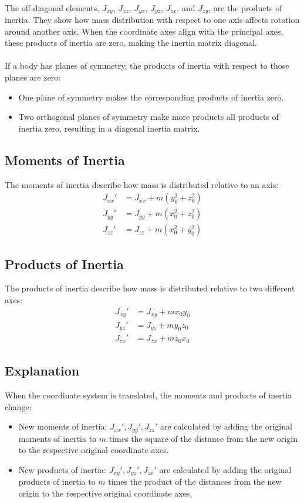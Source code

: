 \\
The off-diagonal elements, \( J_{xy} \), \( J_{xz} \), \( J_{yx} \), \( J_{yz} \), \( J_{zx} \), and \( J_{zy} \), are the products of inertia. They show how mass distribution with respect to one axis affects rotation around another axis. When the coordinate axes align with the principal axes, these products of inertia are zero, making the inertia matrix diagonal.
\\
\\
If a body has planes of symmetry, the products of inertia with respect to those planes are zero:
\begin{itemize}
    \item One plane of symmetry makes the corresponding products of inertia zero.
    \item Two orthogonal planes of symmetry make more products all products of inertia zero, resulting in a diagonal inertia matrix.
\end{itemize}


\subsection{Moments of Inertia}
The moments of inertia describe how mass is distributed relative to an axis:
\begin{align*}
    J_{xx}' &= J_{xx} + m (y_0^2 + z_0^2) \\
    J_{yy}' &= J_{yy} + m (x_0^2 + z_0^2) \\
    J_{zz}' &= J_{zz} + m (x_0^2 + y_0^2)
\end{align*}

\subsection{Products of Inertia}
The products of inertia describe how mass is distributed relative to two different axes:
\begin{align*}
    J_{xy}' &= J_{xy} + m x_0 y_0 \\
    J_{yz}' &= J_{yz} + m y_0 z_0 \\
    J_{zx}' &= J_{zx} + m z_0 x_0
\end{align*}

\subsection{Explanation}
When the coordinate system is translated, the moments and products of inertia change:
\begin{itemize}
    \item New moments of inertia: \( J_{xx}', J_{yy}', J_{zz}' \) are calculated by adding the original moments of inertia to \( m \) times the square of the distance from the new origin to the respective original coordinate axes.
    \item New products of inertia: \( J_{xy}', J_{yz}', J_{zx}' \) are calculated by adding the original products of inertia to \( m \) times the product of the distances from the new origin to the respective original coordinate axes.
\end{itemize}

